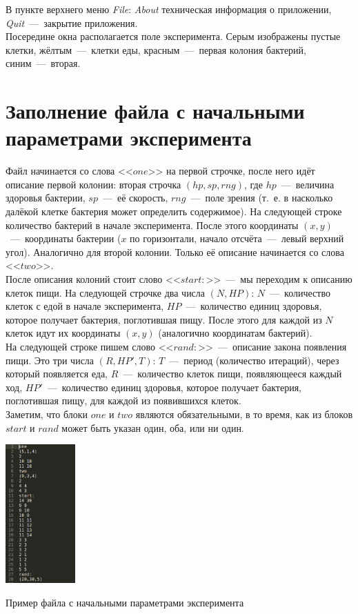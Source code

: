 \documentclass[11pt,twoside,twocolumn,russian,a4paper]{article}
\begin{document}
\noindent В пункте верхнего меню \textit{File}: \textit{About} техническая информация о приложении, \textit{Quit}~---~закрытие приложения.\medskip\\
Посередине окна располагается поле эксперимента. Серым изображены пустые клетки, жёлтым~---~клетки еды, красным~---~первая колония бактерий, синим~---~вторая.

\section{\color{blue}Заполнение файла с начальными параметрами эксперимента}

Файл начинается со слова <<$one$>> на первой строчке, после него идёт описание первой колонии: вторая строчка $(hp,sp,rng)$, где $hp$~---~величина здоровья бактерии, $sp$~---~её скорость, $rng$~---~поле зрения (т.~е. в насколько далёкой клетке бактерия может определить содержимое). На следующей строке количество бактерий в начале эксперимента. После этого координаты $(x,y)$~---~координаты бактерии ($x$ по горизонтали, начало отсчёта~---~левый верхний угол). Аналогично для второй колонии. Только её описание начинается со слова <<$two$>>.\smallskip\\
\noindent После описания колоний стоит слово <<$start:$>>~---~мы переходим к описанию клеток пищи. На следующей строчке два числа $(N, HP)$: $N$~---~количество клеток с едой в начале эксперимента, $HP$~---~количество единиц здоровья, которое получает бактерия, поглотившая пищу. После этого для каждой из $N$ клеток идут их координаты $(x,y)$ (аналогично координатам бактерий).\smallskip\\
\noindent На следующей строке пишем слово <<$rand:$>>~---~описание закона появления пищи. Это три числа $(R, HP', T)$: $T$~---~период (количество итераций), через который появляется еда, $R$~---~количество клеток пищи, появляющееся каждый ход, $HP'$~---~количество единиц здоровья, которое получает бактерия, поглотившая пищу, для каждой из появившихся клеток.\smallskip\\
\noindent Заметим, что блоки $one$ и $two$ являются обязательными, в то время, как из блоков $start$ и $rand$ может быть указан один, оба, или ни один.

\begin{center}
\captionsetup{type=figure}
  \includegraphics[width=0.2\textwidth]{help-scr9.png}
	\caption{Пример файла с начальными параметрами эксперимента}
\end{center}
\end{document}
